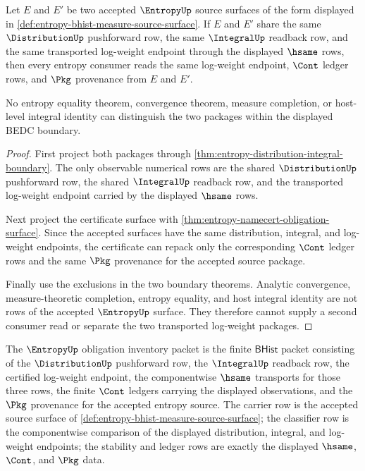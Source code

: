 \begin{theorem}
\label{thm:entropy-log-weight-transport-determinacy}
Let $E$ and $E'$ be two accepted $\EntropyUp$ source surfaces of the form
displayed in \autoref{def:entropy-bhist-measure-source-surface}. If $E$ and
$E'$ share the same $\DistributionUp$ pushforward row, the same $\IntegralUp$
readback row, and the same transported log-weight endpoint through the
displayed $\hsame$ rows, then every entropy consumer reads the same log-weight
endpoint, $\Cont$ ledger rows, and $\Pkg$ provenance from $E$ and $E'$.

No entropy equality theorem, convergence theorem, measure completion, or
host-level integral identity can distinguish the two packages within the
displayed BEDC boundary.
\end{theorem}
\begin{proof}
First project both packages through
\autoref{thm:entropy-distribution-integral-boundary}. The only observable
numerical rows are the shared $\DistributionUp$ pushforward row, the shared
$\IntegralUp$ readback row, and the transported log-weight endpoint carried by
the displayed $\hsame$ rows.

Next project the certificate surface with
\autoref{thm:entropy-namecert-obligation-surface}. Since the accepted surfaces
have the same distribution, integral, and log-weight endpoints, the certificate
can repack only the corresponding $\Cont$ ledger rows and the same $\Pkg$
provenance for the accepted source package.

Finally use the exclusions in the two boundary theorems. Analytic convergence,
measure-theoretic completion, entropy equality, and host integral identity are
not rows of the accepted $\EntropyUp$ surface. They therefore cannot supply a
second consumer read or separate the two transported log-weight packages.
\end{proof}

\begin{definition}
\label{def:entropy-obligation-inventory-packet}
The $\EntropyUp$ obligation inventory packet is the finite $\mathsf{BHist}$
packet consisting of the $\DistributionUp$ pushforward row, the $\IntegralUp$
readback row, the certified log-weight endpoint, the componentwise $\hsame$
transports for those three rows, the finite $\Cont$ ledgers carrying the
displayed observations, and the $\Pkg$ provenance for the accepted entropy
source. The carrier row is the accepted source surface of
\autoref{def:entropy-bhist-measure-source-surface}; the classifier row is the
componentwise comparison of the displayed distribution, integral, and
log-weight endpoints; the stability and ledger rows are exactly the displayed
$\hsame$, $\Cont$, and $\Pkg$ data.
\end{definition}

